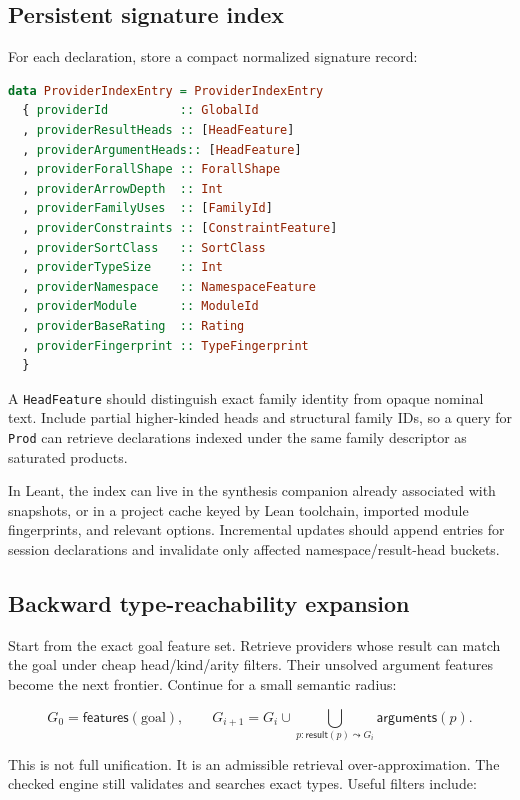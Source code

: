 \documentclass[11pt]{article}
\newcommand{\code}[1]{\texttt{#1}}
\newcommand{\Leant}{\textsf{Leant}}
\begin{document}
\subsection{Persistent signature index}

For each declaration, store a compact normalized signature record:

\begin{lstlisting}[language=Haskell]
data ProviderIndexEntry = ProviderIndexEntry
  { providerId          :: GlobalId
  , providerResultHeads :: [HeadFeature]
  , providerArgumentHeads:: [HeadFeature]
  , providerForallShape :: ForallShape
  , providerArrowDepth  :: Int
  , providerFamilyUses  :: [FamilyId]
  , providerConstraints :: [ConstraintFeature]
  , providerSortClass   :: SortClass
  , providerTypeSize    :: Int
  , providerNamespace   :: NamespaceFeature
  , providerModule      :: ModuleId
  , providerBaseRating  :: Rating
  , providerFingerprint :: TypeFingerprint
  }
\end{lstlisting}

A \code{HeadFeature} should distinguish exact family identity from opaque
nominal text.  Include partial higher-kinded heads and structural family IDs,
so a query for \code{Prod} can retrieve declarations indexed under the same
family descriptor as saturated products.

In \Leant{}, the index can live in the synthesis companion already associated
with snapshots, or in a project cache keyed by Lean toolchain, imported module
fingerprints, and relevant options.  Incremental updates should append entries
for session declarations and invalidate only affected namespace/result-head
buckets.

\subsection{Backward type-reachability expansion}

Start from the exact goal feature set.  Retrieve providers whose result can
match the goal under cheap head/kind/arity filters.  Their unsolved argument
features become the next frontier.  Continue for a small semantic radius:

\[
  G_0 = \mathsf{features}(\text{goal}), \qquad
  G_{i+1} = G_i \cup
    \bigcup_{p : \mathsf{result}(p)\leadsto G_i}
      \mathsf{arguments}(p).
\]

This is not full unification.  It is an admissible retrieval over-approximation.
The checked engine still validates and searches exact types.  Useful filters
include:
\end{document}
